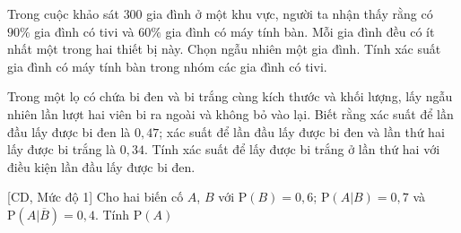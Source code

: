 \begin{bt}%
	Trong cuộc khảo sát $300$ gia đình ở một khu vực, người ta nhận thấy rằng có $90\%$ gia đình có tivi và $60\%$ gia đình có máy tính bàn. Mỗi gia đình đều có ít nhất một trong hai thiết bị này. Chọn ngẫu nhiên một gia đình. Tính xác suất gia đình có máy tính bàn trong nhóm các gia đình có tivi. 	
\end{bt}

\begin{bt}%
Trong một lọ có chứa bi đen và bi trắng cùng kích thước và khối lượng, lấy ngẫu nhiên lần lượt hai viên bi ra ngoài và không bỏ vào lại. Biết rằng xác suất để lần đầu lấy được bi đen là $0{,}47$; xác suất để lần đầu lấy được bi đen và lần thứ hai lấy được bi trắng là $0{,34}$. Tính xác suất để lấy được bi trắng ở lần thứ hai với điều kiện lần đầu lấy được bi đen. 
\end{bt}

\begin{bt}%
[CD, Mức độ 1]%
	Cho hai biến cố $A$, $B$ với $\mathrm{P}(B)=0{,}6$; $\mathrm{P}(A|B) =0{,}7$ và $\mathrm{P}\left(A|\overline{B}\right)=0{,}4$. Tính $\mathrm{P}(A)$
\end{bt}

